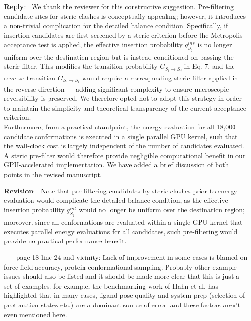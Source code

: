 \documentclass[doublespace,prb,aps]{article}
\newcounter{reviewer}
\newcounter{point}[reviewer]
\renewcommand{\thepoint}{Comment\,\thereviewer.\arabic{point}}
\newenvironment{point}
   {\refstepcounter{point} \bigskip \noindent {\textbf{Reviewer~\thepoint} } ---\ }
   {\par }
\newenvironment{reply}
   {\medskip \noindent \color{black} \begin{sf}\textbf{Reply}:\  }
   {\medskip \par \end{sf}}
\newenvironment{revision}
   {\medskip \noindent \color{blue} \begin{sf}\textbf{Revision}:\textit{\ }}
   {\medskip \par \end{sf}}
\begin{document}
\begin{reply}
We thank the reviewer for this constructive suggestion.
Pre-filtering candidate sites for steric clashes is conceptually appealing; 
however, it introduces a non-trivial complication for the detailed balance condition. 
Specifically, if insertion candidates are first screened by a steric criterion before the Metropolis acceptance test is applied, 
the effective insertion probability $g^{ins}_{S_j}$ is no longer uniform over the destination region but is instead conditioned on passing the steric filter. 
This modifies the transition probability $G_{S_i \to S_j}$ in Eq. 7, 
and the reverse transition $G_{S_j \to S_i}$ would require a corresponding steric filter applied in the reverse direction 
— adding significant complexity to ensure microscopic reversibility is preserved. 
We therefore opted not to adopt this strategy in order to maintain the simplicity and theoretical transparency of the current acceptance criterion. \\
\newline
Furthermore, from a practical standpoint, the energy evaluation for all 18,000 candidate conformations is executed in a single parallel GPU kernel, 
such that the wall-clock cost is largely independent of the number of candidates evaluated. 
A steric pre-filter would therefore provide negligible computational benefit in our GPU-accelerated implementation. 
We have added a brief discussion of both points in the revised manuscript.
\end{reply}

\begin{revision}
Note that pre-filtering candidates by steric clashes prior to energy evaluation would complicate the detailed balance condition, 
as the effective insertion probability $g^{int}_{S_j}$ would no longer be uniform over the destination region; 
moreover, since all conformations are evaluated within a single GPU kernel that executes parallel energy evaluations for all candidates, 
such pre-filtering would provide no practical performance benefit.
\end{revision}

\begin{point}
page 18 line 24 and vicinity: Lack of improvement in some cases is blamed on force field accuracy, protein conformational sampling. Probably other example issues should also be listed and it should be made more clear that this is just a set of examples; for example, the benchmarking work of Hahn et al. has highlighted that in many cases, ligand pose quality and system prep (selection of protonation states etc.) are a dominant source of error, and these factors aren't even mentioned here. \label{comment_18}
\end{point}
\end{document}
